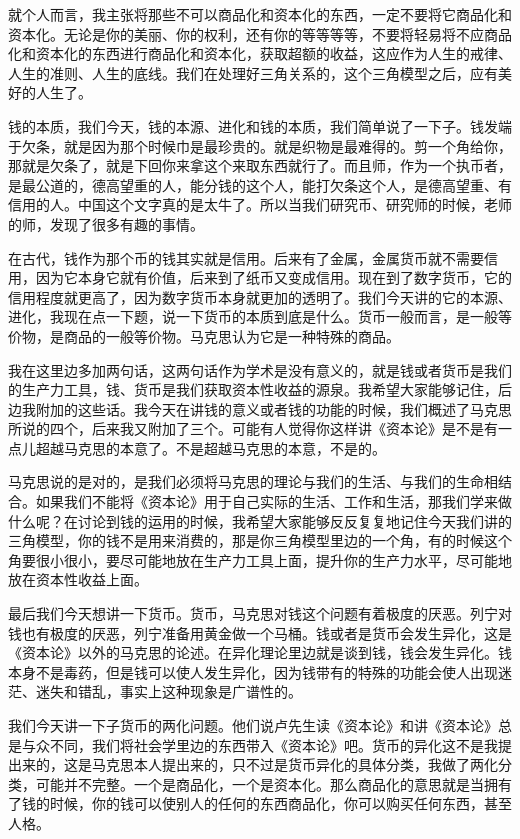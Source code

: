 \documentclass[UTF8, 12pt, a4paper]{ctexrep}
\begin{document}
就个人而言，我主张将那些不可以商品化和资本化的东西，一定不要将它商品化和资本化。无论是你的美丽、你的权利，还有你的等等等等，不要将轻易将不应商品化和资本化的东西进行商品化和资本化，获取超额的收益，这应作为人生的戒律、人生的准则、人生的底线。我们在处理好三角关系的，这个三角模型之后，应有美好的人生了。

钱的本质，我们今天，钱的本源、进化和钱的本质，我们简单说了一下子。钱发端于欠条，就是因为那个时候巾是最珍贵的。就是织物是最难得的。剪一个角给你，那就是欠条了，就是下回你来拿这个来取东西就行了。而且师，作为一个执币者，是最公道的，德高望重的人，能分钱的这个人，能打欠条这个人，是德高望重、有信用的人。中国这个文字真的是太牛了。所以当我们研究币、研究师的时候，老师的师，发现了很多有趣的事情。

在古代，钱作为那个币的钱其实就是信用。后来有了金属，金属货币就不需要信用，因为它本身它就有价值，后来到了纸币又变成信用。现在到了数字货币，它的信用程度就更高了，因为数字货币本身就更加的透明了。我们今天讲的它的本源、进化，我现在点一下题，说一下货币的本质到底是什么。货币一般而言，是一般等价物，是商品的一般等价物。马克思认为它是一种特殊的商品。

我在这里边多加两句话，这两句话作为学术是没有意义的，就是钱或者货币是我们的生产力工具，钱、货币是我们获取资本性收益的源泉。我希望大家能够记住，后边我附加的这些话。我今天在讲钱的意义或者钱的功能的时候，我们概述了马克思所说的四个，后来我又附加了三个。可能有人觉得你这样讲《资本论》是不是有一点儿超越马克思的本意了。不是超越马克思的本意，不是的。

马克思说的是对的，是我们必须将马克思的理论与我们的生活、与我们的生命相结合。如果我们不能将《资本论》用于自己实际的生活、工作和生活，那我们学来做什么呢？在讨论到钱的运用的时候，我希望大家能够反反复复地记住今天我们讲的三角模型，你的钱不是用来消费的，那是你三角模型里边的一个角，有的时候这个角要很小很小，要尽可能地放在生产力工具上面，提升你的生产力水平，尽可能地放在资本性收益上面。

最后我们今天想讲一下货币。货币，马克思对钱这个问题有着极度的厌恶。列宁对钱也有极度的厌恶，列宁准备用黄金做一个马桶。钱或者是货币会发生异化，这是《资本论》以外的马克思的论述。在异化理论里边就是谈到钱，钱会发生异化。钱本身不是毒药，但是钱可以使人发生异化，因为钱带有的特殊的功能会使人出现迷茫、迷失和错乱，事实上这种现象是广谱性的。

我们今天讲一下子货币的两化问题。他们说卢先生读《资本论》和讲《资本论》总是与众不同，我们将社会学里边的东西带入《资本论》吧。货币的异化这不是我提出来的，这是马克思本人提出来的，只不过是货币异化的具体分类，我做了两化分类，可能并不完整。一个是商品化，一个是资本化。那么商品化的意思就是当拥有了钱的时候，你的钱可以使别人的任何的东西商品化，你可以购买任何东西，甚至人格。
\end{document}
